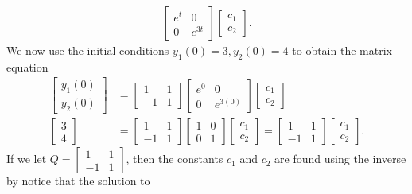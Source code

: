 \begin{example}
\begin{align*}
\begin{bmatrix}e^t&0\\0&e^{3t}\end{bmatrix}
\begin{bmatrix}c_1\\c_2\end{bmatrix} 
.\end{align*}
We now use the initial conditions $y_1(0)=3,y_2(0)=4$ to obtain the matrix equation 
\begin{align*}
\begin{bmatrix}y_1(0)\\y_2(0)\end{bmatrix} 
&= 
\begin{bmatrix}1 &1\\-1&1\end{bmatrix}
\begin{bmatrix}e^{0}&0\\0&e^{3(0)}\end{bmatrix}
\begin{bmatrix}c_1\\c_2\end{bmatrix} 
\\
\begin{bmatrix}3\\4\end{bmatrix} 
&= 
\begin{bmatrix}1 &1\\-1&1\end{bmatrix}
\begin{bmatrix}1&0\\0&1\end{bmatrix}
\begin{bmatrix}c_1\\c_2\end{bmatrix} 
=
\begin{bmatrix}1 &1\\-1&1\end{bmatrix}
\begin{bmatrix}c_1\\c_2\end{bmatrix} .
\end{align*} 
If we let $Q = \begin{bmatrix}1 &1\\-1&1\end{bmatrix}$, then the constants $c_1$ and $c_2$ are found using the inverse by notice that the solution to 


\end{example}
